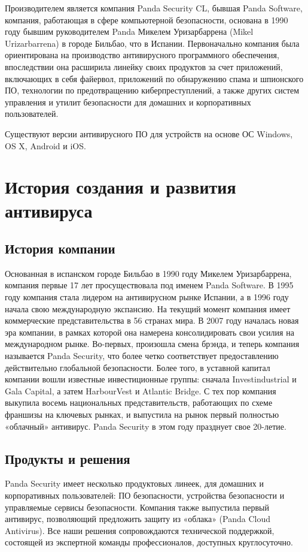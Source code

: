     Производителем является компания Panda Security CL, бывшая Panda Software, компания, работающая
    в сфере компьютерной безопасности, основана в 1990 году бывшим руководителем Panda Микелем 
    Уризарбаррена (Mikel Urizarbarrena) в городе Бильбао, что в Испании. Первоначально компания была
    ориентирована на производство антивирусного программного обеспечения, впоследствии она расширила
    линейку своих продуктов за счет приложений, включающих в себя файервол, приложений по обнаружению
    спама и шпионского ПО, технологии по предотвращению киберпреступлений, а также других систем
    управления и утилит безопасности для домашних и корпоративных пользователей.\par

    Существуют версии антивирусного ПО для устройств на основе ОС Windows, OS X, Android и iOS.
    \pagebreak

    \section{История создания и развития антивируса}
    \subsection{История компании}
        Основанная в испанском городе Бильбао в 1990 году Микелем Уризарбаррена, компания первые 17 лет
        просуществовала под именем Panda Software. В 1995 году компания стала лидером на антивирусном рынке
        Испании, а в 1996 году начала свою международную экспансию. На текущий момент компания имеет коммерческие
        представительства в 56 странах мира. В 2007 году началась новая эра компании, в рамках которой она
        намерена консолидировать свои усилия на международном рынке. Во-первых, произошла смена брэнда, и
        теперь компания называется Panda Security, что более четко соответствует предоставлению действительно
        глобальной безопасности. Более того, в уставной капитал компании вошли известные инвестиционные группы:
        сначала Investindustrial и Gala Capital, а затем HarbourVest и Atlantic Bridge. С тех пор компания
        выкупила восемь национальных представительств, работающих по схеме франшизы на ключевых рынках, и
        выпустила на рынок первый полностью «облачный» антивирус. Panda Security в этом году празднует свое
        20-летие.
    \subsection{Продукты и решения}
        Panda Security имеет несколько продуктовых линеек, для домашних и корпоративных пользователей: ПО
        безопасности, устройства безопасности и управляемые сервисы безопасности. Компания также выпустила
        первый антивирус, позволяющий предложить защиту из «облака» (Panda Cloud Antivirus). Все наши решения
        сопровождаются технической поддержкой, состоящей из экспертной команды профессионалов, доступных
        круглосуточно.
